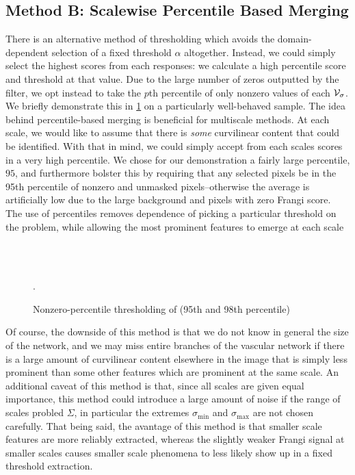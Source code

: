 \subsection{Method B: Scalewise Percentile Based Merging}

There is an alternative method of thresholding which avoids the domain-dependent selection of a fixed threshold $\alpha$ altogether. Instead, we could simply select the highest scores from each responses: we calculate a high percentile score and threshold at that value. Due to the large number of zeros outputted by the filter, we opt instead to take the $p$th percentile of only nonzero values of each $\mathcal{V}_{\sigma}$. 
We briefly demonstrate this in \cref{fig:qthresh_demo} on a particularly well-behaved sample. The idea behind percentile-based merging is beneficial for multiscale methods. At each scale, we would like to assume that there is \textit{some} curvilinear content that could be identified. With that in mind, we could simply accept from each scales scores in a very high percentile. We chose for our demonstration a fairly large percentile, $95$, and furthermore bolster this by requiring that any selected pixels be in the 95th percentile of nonzero and unmasked pixels--otherwise the average is artificially low due to the large background and pixels with zero Frangi score. The use of percentiles removes dependence of picking a particular threshold on the problem, while allowing the most prominent features to emerge at each scale

\begin{figure} \centering
	 \\
	 \\
	\caption{Nonzero-percentile thresholding of \Vmax (95th and 98th percentile)}.
	\label{fig:qthresh_demo}
\end{figure}

Of course, the downside of this method is that we do not know in general the size of the network, and  we may miss entire branches of the vascular network if there is a large amount of curvilinear content elsewhere in the image that is simply less prominent than some other features which are prominent at the same scale. An additional caveat of this method is that, since all scales are given equal importance, this method could introduce a large amount of noise if the range of scales probled $\Sigma$, in particular the extremes $\sigma_{\min}$ and $\sigma_{\max}$ are not chosen carefully. That being said, the avantage of this method is that smaller scale features are more reliably extracted, whereas the slightly weaker Frangi signal at smaller scales causes smaller scale phenomena to less likely show up in a fixed threshold extraction.




